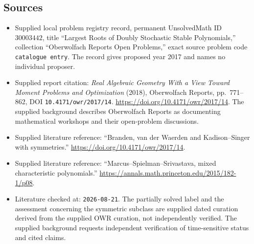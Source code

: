 \documentclass[11pt]{article}
\begin{document}
\subsection{Sources}
\begin{itemize}
\item Supplied local problem registry record, permanent UnsolvedMath ID \(30003442\), title ``Largest Roots of Doubly Stochastic Stable Polynomials,'' collection ``Oberwolfach Reports Open Problems,'' exact source problem code \texttt{catalogue entry}. The record gives proposed year 2017 and names no individual proposer.
\item Supplied report citation: \emph{Real Algebraic Geometry With a View Toward Moment Problems and Optimization} (2018), Oberwolfach Reports, pp.~771--862, DOI \texttt{10.4171/owr/2017/14}. \url{https://doi.org/10.4171/owr/2017/14}. The supplied background describes Oberwolfach Reports as documenting mathematical workshops and their open-problem discussions.
\item Supplied literature reference: ``Branden, van der Waerden and Kadison--Singer with symmetries.'' \url{https://doi.org/10.4171/owr/2017/14}.
\item Supplied literature reference: ``Marcus--Spielman--Srivastava, mixed characteristic polynomials.'' \url{https://annals.math.princeton.edu/2015/182-1/p08}.
\item Literature checked at: \texttt{2026-08-21}. The partially solved label and the assessment concerning the symmetric subclass are supplied dated curation derived from the supplied OWR curation, not independently verified. The supplied background requests independent verification of time-sensitive status and cited claims.
\end{itemize}
\end{document}
